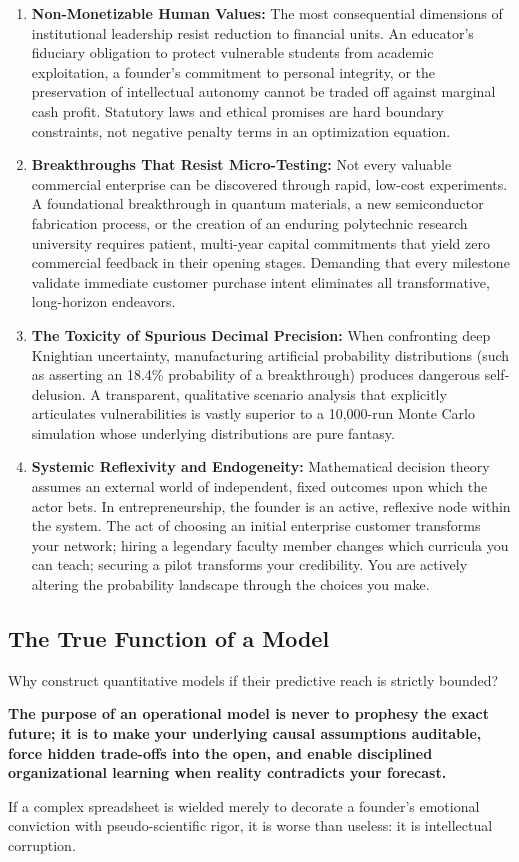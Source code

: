 \begin{enumerate}[leftmargin=12pt,itemsep=3pt,topsep=2pt,parsep=0pt]
  \item \textbf{Non-Monetizable Human Values:} The most consequential dimensions of institutional leadership resist reduction to financial units. An educator's fiduciary obligation to protect vulnerable students from academic exploitation, a founder's commitment to personal integrity, or the preservation of intellectual autonomy cannot be traded off against marginal cash profit. Statutory laws and ethical promises are hard boundary constraints, not negative penalty terms in an optimization equation.
  \item \textbf{Breakthroughs That Resist Micro-Testing:} Not every valuable commercial enterprise can be discovered through rapid, low-cost experiments. A foundational breakthrough in quantum materials, a new semiconductor fabrication process, or the creation of an enduring polytechnic research university requires patient, multi-year capital commitments that yield zero commercial feedback in their opening stages. Demanding that every milestone validate immediate customer purchase intent eliminates all transformative, long-horizon endeavors.
  \item \textbf{The Toxicity of Spurious Decimal Precision:} When confronting deep Knightian uncertainty, manufacturing artificial probability distributions (such as asserting an 18.4\% probability of a breakthrough) produces dangerous self-delusion. A transparent, qualitative scenario analysis that explicitly articulates vulnerabilities is vastly superior to a 10,000-run Monte Carlo simulation whose underlying distributions are pure fantasy.
  \item \textbf{Systemic Reflexivity and Endogeneity:} Mathematical decision theory assumes an external world of independent, fixed outcomes upon which the actor bets. In entrepreneurship, the founder is an active, reflexive node within the system. The act of choosing an initial enterprise customer transforms your network; hiring a legendary faculty member changes which curricula you can teach; securing a pilot transforms your credibility. You are actively altering the probability landscape through the choices you make.
\end{enumerate}

\subsection{The True Function of a Model}

Why construct quantitative models if their predictive reach is strictly bounded?

\textbf{The purpose of an operational model is never to prophesy the exact future; it is to make your underlying causal assumptions auditable, force hidden trade-offs into the open, and enable disciplined organizational learning when reality contradicts your forecast.}

If a complex spreadsheet is wielded merely to decorate a founder's emotional conviction with pseudo-scientific rigor, it is worse than useless: it is intellectual corruption.

